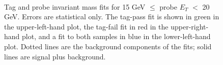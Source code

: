 \documentclass[dissertation.tex]{subfiles}
\begin{document}
\begin{figure}
	\centering
	\\
	\caption{Tag and probe invariant mass fits for 15 GeV $\leq$ probe $E_{T}$ $<$ 20 GeV.  Errors are statistical only.  The tag-pass fit is shown in green in the upper-left-hand plot, the tag-fail fit in red in the upper-right-hand plot, and a fit to both samples in blue in the lower-left-hand plot.  Dotted lines are the background components of the fits; solid lines are signal plus background.}
	\label{fig:low_ET_bin}
\end{figure}
\end{document}
